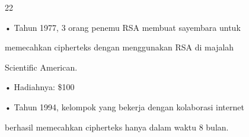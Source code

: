 \documentclass{article}
\begin{document}

22

• Tahun 1977, 3 orang penemu RSA membuat sayembara untuk 

memecahkan cipherteks dengan menggunakan RSA di majalah 

Scientific American.

• Hadiahnya: \$100

• Tahun 1994, kelompok yang bekerja dengan kolaborasi internet 

berhasil memecahkan cipherteks hanya dalam waktu 8 bulan.
\end{document}
